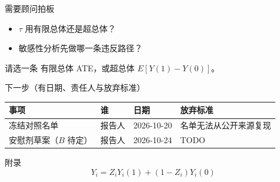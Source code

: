 \documentclass[aspectratio=169,10pt]{beamer}
\begin{document}
\begin{frame}{需要顾问拍板}
  \begin{itemize}
    \item \(\tau\) 用有限总体还是超总体？
    \item 敏感性分析先做哪一条违反路径？
  \end{itemize}
  \begin{alertblock}{请选一条}
    有限总体 ATE，或超总体 \(E[Y(1)-Y(0)]\)。
  \end{alertblock}
\end{frame}

\begin{frame}{下一步（有日期、责任人与放弃标准）}
  \vspace{4pt}
  \begin{tabular}{llll}
    \toprule
    事项 & 谁 & 日期 & 放弃标准 \\
    \midrule
    冻结对照名单 & 报告人 & 2026-10-20 & 名单无法从公开来源复现 \\
    安慰剂草案（\(B\) 待定） & 报告人 & 2026-10-24 & TODO \\
    \bottomrule
  \end{tabular}
\end{frame}

\appendix
\begin{frame}{附录}
  \begin{equation*}
    Y_i = Z_i Y_i(1) + (1-Z_i)Y_i(0)
  \end{equation*}
\end{frame}
\end{document}
